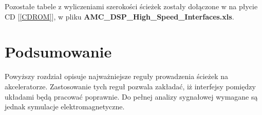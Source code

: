 Pozostałe tabele z wyliczeniami szerokości ścieżek zostały dołączone w na płycie CD [\ref{CDROM}], w pliku \textbf{AMC\_DSP\_High\_Speed\_Interfaces.xls}. 


\section{Podsumowanie}
Powyższy rozdział opisuje najważniejsze reguły prowadzenia ścieżek na akceleratorze. Zastosowanie tych reguł pozwala zakładać, iż interfejsy pomiędzy układami będą pracować poprawnie. Do pełnej analizy sygnałowej wymagane są jednak symulacje elektromagnetyczne.
